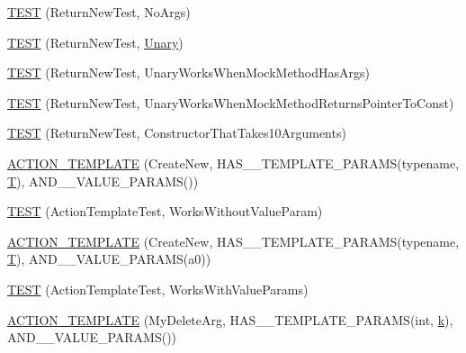 \begin{DoxyCompactItemize}
\item 
\hyperlink{namespacetesting_1_1gmock__generated__actions__test_a058a3d17071ddb888319ab71b491af94}{T\+E\+ST} (Return\+New\+Test, No\+Args)
\item 
\hyperlink{namespacetesting_1_1gmock__generated__actions__test_a64f3f8327d51c139b441846e809ae4bc}{T\+E\+ST} (Return\+New\+Test, \hyperlink{namespacetesting_1_1gmock__generated__actions__test_a61f0e6c3f2c07079299f1d6e1667ab92}{Unary})
\item 
\hyperlink{namespacetesting_1_1gmock__generated__actions__test_ad8f696b14b0f2dba4986c53f615aef15}{T\+E\+ST} (Return\+New\+Test, Unary\+Works\+When\+Mock\+Method\+Has\+Args)
\item 
\hyperlink{namespacetesting_1_1gmock__generated__actions__test_ad9f45ddc4a5616b919116c766ad37a30}{T\+E\+ST} (Return\+New\+Test, Unary\+Works\+When\+Mock\+Method\+Returns\+Pointer\+To\+Const)
\item 
\hyperlink{namespacetesting_1_1gmock__generated__actions__test_a1ed6392f4aeb68b9429ff7dd98ce5a86}{T\+E\+ST} (Return\+New\+Test, Constructor\+That\+Takes10\+Arguments)
\item 
\hyperlink{namespacetesting_1_1gmock__generated__actions__test_a1debc0726715951fcd7f5443e436dc46}{A\+C\+T\+I\+O\+N\+\_\+\+T\+E\+M\+P\+L\+A\+TE} (Create\+New, H\+A\+S\+\_\+\_\+\+T\+E\+M\+P\+L\+A\+T\+E\+\_\+\+P\+A\+R\+A\+MS(typename, \hyperlink{functions__7_8js_adf1f3edb9115acb0a1e04209b7a9937b}{T}), A\+N\+D\+\_\+\_\+\+V\+A\+L\+U\+E\+\_\+\+P\+A\+R\+A\+MS())
\item 
\hyperlink{namespacetesting_1_1gmock__generated__actions__test_aaac879cbe00638dcc2d4733760180a4f}{T\+E\+ST} (Action\+Template\+Test, Works\+Without\+Value\+Param)
\item 
\hyperlink{namespacetesting_1_1gmock__generated__actions__test_a38fb8047f95126bb0b2cfe7e670c8af7}{A\+C\+T\+I\+O\+N\+\_\+\+T\+E\+M\+P\+L\+A\+TE} (Create\+New, H\+A\+S\+\_\+\_\+\+T\+E\+M\+P\+L\+A\+T\+E\+\_\+\+P\+A\+R\+A\+MS(typename, \hyperlink{functions__7_8js_adf1f3edb9115acb0a1e04209b7a9937b}{T}), A\+N\+D\+\_\+\_\+\+V\+A\+L\+U\+E\+\_\+\+P\+A\+R\+A\+MS(a0))
\item 
\hyperlink{namespacetesting_1_1gmock__generated__actions__test_a21f6e2ad5c4c1afecca93a42c9a84f1a}{T\+E\+ST} (Action\+Template\+Test, Works\+With\+Value\+Params)
\item 
\hyperlink{namespacetesting_1_1gmock__generated__actions__test_aaaac0fbf0bf2c7bd8fc104310e6af25c}{A\+C\+T\+I\+O\+N\+\_\+\+T\+E\+M\+P\+L\+A\+TE} (My\+Delete\+Arg, H\+A\+S\+\_\+\_\+\+T\+E\+M\+P\+L\+A\+T\+E\+\_\+\+P\+A\+R\+A\+MS(int, \hyperlink{jquery_8js_ab26645c014aa005ecedef329ecf58c99}{k}), A\+N\+D\+\_\+\_\+\+V\+A\+L\+U\+E\+\_\+\+P\+A\+R\+A\+MS())

\end{DoxyCompactItemize}
